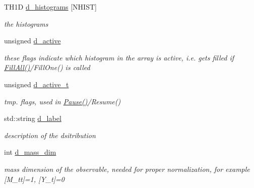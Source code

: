 \begin{DoxyCompactItemize}
\item 
\hypertarget{classHistArray_a53fda50a10b8ba766d44b789313c64c4}{T\-H1\-D \hyperlink{classHistArray_a53fda50a10b8ba766d44b789313c64c4}{d\-\_\-histograms} \mbox{[}N\-H\-I\-S\-T\mbox{]}}\label{classHistArray_a53fda50a10b8ba766d44b789313c64c4}

\begin{DoxyCompactList}\small\item\em the histograms \end{DoxyCompactList}\item 
\hypertarget{classHistArray_ae6faae6b22f5dc62ba9c664a93e8ea82}{unsigned \hyperlink{classHistArray_ae6faae6b22f5dc62ba9c664a93e8ea82}{d\-\_\-active}}\label{classHistArray_ae6faae6b22f5dc62ba9c664a93e8ea82}

\begin{DoxyCompactList}\small\item\em these flags indicate which histogram in the array is active, i.\-e. gets filled if \hyperlink{classHistArray_ae8d7189d1f2b9710a3228deac3eb1fa4}{Fill\-All()}/\-Fill\-One() is called \end{DoxyCompactList}\item 
\hypertarget{classHistArray_ac477be77aa121bf1cbeea842debb2579}{unsigned \hyperlink{classHistArray_ac477be77aa121bf1cbeea842debb2579}{d\-\_\-active\-\_\-t}}\label{classHistArray_ac477be77aa121bf1cbeea842debb2579}

\begin{DoxyCompactList}\small\item\em tmp. flags, used in \hyperlink{classHistArray_a27f9acb7029ec4c90b4476e5bc26037d}{Pause()}/\-Resume() \end{DoxyCompactList}\item 
\hypertarget{classHistArray_a273ef1bf687ee03dd17d106075bb07e2}{std\-::string \hyperlink{classHistArray_a273ef1bf687ee03dd17d106075bb07e2}{d\-\_\-label}}\label{classHistArray_a273ef1bf687ee03dd17d106075bb07e2}

\begin{DoxyCompactList}\small\item\em description of the dsitribution \end{DoxyCompactList}\item 
\hypertarget{classHistArray_ac682fdf0aeedf8f0b9fb8c4c4b1fee71}{int \hyperlink{classHistArray_ac682fdf0aeedf8f0b9fb8c4c4b1fee71}{d\-\_\-mass\-\_\-dim}}\label{classHistArray_ac682fdf0aeedf8f0b9fb8c4c4b1fee71}

\begin{DoxyCompactList}\small\item\em mass dimension of the observable, needed for proper normalization, for example \mbox{[}M\-\_\-tt\mbox{]}=1, \mbox{[}Y\-\_\-t\mbox{]}=0 \end{DoxyCompactList}\end{DoxyCompactItemize}
